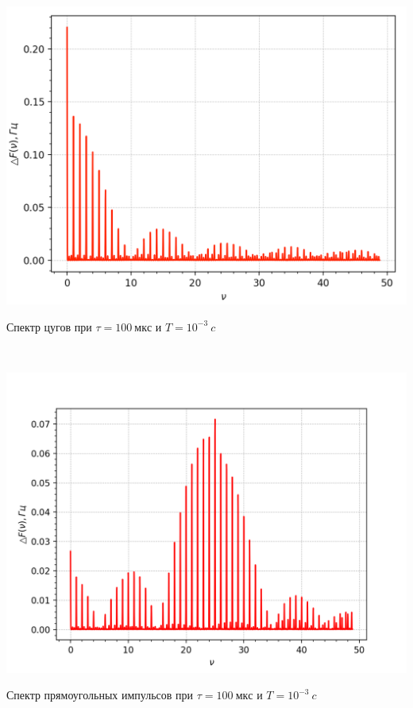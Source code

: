 \begin{minipage}{0.45\textwidth}
\includegraphics[width=\linewidth]{1.png}\\
\begin{center}
Спектр цугов при $\tau = 100 \ мкс $ и $T = 10^{-3} \ c$
\end{center}
\end{minipage}
\begin{minipage}{0.05\textwidth}
\
\end{minipage}
\begin{minipage}{0.45\textwidth}
\includegraphics[width=\linewidth]{4.png}\\
\begin{center}
Спектр прямоугольных импульсов при $\tau = 100 \ мкс $ и $T = 10^{-3} \ c$
\end{center}
\end{minipage}


